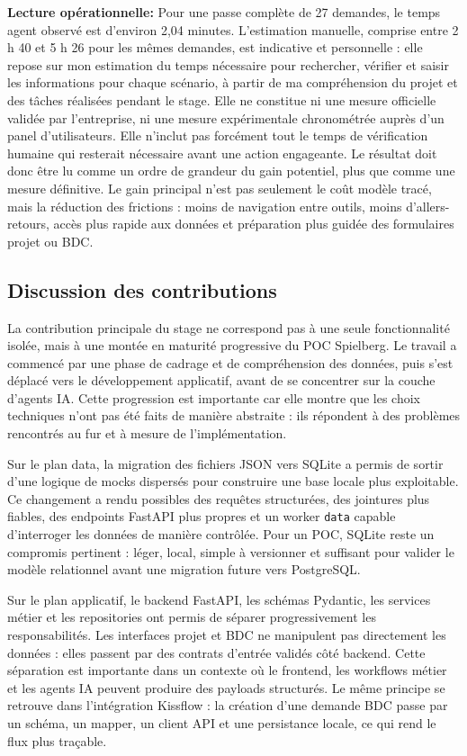 \documentclass[a4paper,11pt,english,openany]{book}
\begin{document}
\textbf{Lecture opérationnelle:}
Pour une passe complète de 27 demandes, le temps agent observé est d'environ 2,04 minutes. L'estimation manuelle, comprise entre 2 h 40 et 5 h 26 pour les mêmes demandes, est indicative et personnelle : elle repose sur mon estimation du temps nécessaire pour rechercher, vérifier et saisir les informations pour chaque scénario, à partir de ma compréhension du projet et des tâches réalisées pendant le stage. Elle ne constitue ni une mesure officielle validée par l'entreprise, ni une mesure expérimentale chronométrée auprès d'un panel d'utilisateurs. Elle n'inclut pas forcément tout le temps de vérification humaine qui resterait nécessaire avant une action engageante. Le résultat doit donc être lu comme un ordre de grandeur du gain potentiel, plus que comme une mesure définitive. Le gain principal n'est pas seulement le coût modèle tracé, mais la réduction des frictions : moins de navigation entre outils, moins d'allers-retours, accès plus rapide aux données et préparation plus guidée des formulaires projet ou BDC.

\endgroup

\subsection{Discussion des contributions}

La contribution principale du stage ne correspond pas à une seule fonctionnalité isolée, mais à une montée en maturité progressive du POC Spielberg. Le travail a commencé par une phase de cadrage et de compréhension des données, puis s'est déplacé vers le développement applicatif, avant de se concentrer sur la couche d'agents IA. Cette progression est importante car elle montre que les choix techniques n'ont pas été faits de manière abstraite : ils répondent à des problèmes rencontrés au fur et à mesure de l'implémentation.

Sur le plan data, la migration des fichiers JSON vers SQLite a permis de sortir d'une logique de mocks dispersés pour construire une base locale plus exploitable. Ce changement a rendu possibles des requêtes structurées, des jointures plus fiables, des endpoints FastAPI plus propres et un worker \texttt{data} capable d'interroger les données de manière contrôlée. Pour un POC, SQLite reste un compromis pertinent : léger, local, simple à versionner et suffisant pour valider le modèle relationnel avant une migration future vers PostgreSQL.

Sur le plan applicatif, le backend FastAPI, les schémas Pydantic, les services métier et les repositories ont permis de séparer progressivement les responsabilités. Les interfaces projet et BDC ne manipulent pas directement les données : elles passent par des contrats d'entrée validés côté backend. Cette séparation est importante dans un contexte où le frontend, les workflows métier et les agents IA peuvent produire des payloads structurés. Le même principe se retrouve dans l'intégration Kissflow : la création d'une demande BDC passe par un schéma, un mapper, un client API et une persistance locale, ce qui rend le flux plus traçable.
\end{document}
